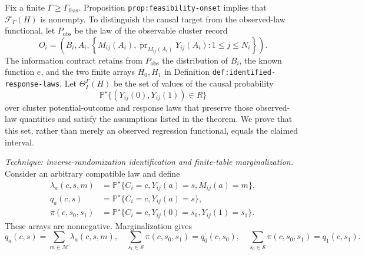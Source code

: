 Fix a finite \(\Gamma\geq\Gamma_{\mathrm{feas}}\).  Proposition \texttt{prop:feasibility-onset} implies that \(\mathcal F_{\Gamma}(H)\) is nonempty.  To distinguish the causal target from the observed-law functional, let \(P_{\mathrm{obs}}\) be the law of the observable cluster record
\[
O_i=\left(B_i,A_i,
  \left\{M_{ij}(A_i),
  \operatorname{pr}_{M_{ij}(A_i)}Y_{ij}(A_i):1\leq j\leq N_i\right\}
  \right).
\]
The information contract retains from \(P_{\mathrm{obs}}\) the distribution of \(B_i\), the known function \(e\), and the two finite arrays \(H_0,H_1\) in Definition \texttt{def:identified-response-laws}.  Let \(\Theta_I^{\Gamma}(H)\) be the set of values of the causal probability
\[
\mathbb P^{\star}\{(Y_{ij}(0),Y_{ij}(1))\in R\}
\]
over cluster potential-outcome and response laws that preserve those observed-law quantities and satisfy the assumptions listed in the theorem.  We prove that this set, rather than merely an observed regression functional, equals the claimed interval.

\emph{Technique: inverse-randomization identification and finite-table marginalization.}
Consider an arbitrary compatible law and define
\[
\begin{aligned}
\lambda_a(c,s,m)
  &=\mathbb P^{\star}\{C_i=c,Y_{ij}(a)=s,M_{ij}(a)=m\},\\
q_a(c,s)
  &=\mathbb P^{\star}\{C_i=c,Y_{ij}(a)=s\},\\
\pi(c,s_0,s_1)
  &=\mathbb P^{\star}\{C_i=c,Y_{ij}(0)=s_0,Y_{ij}(1)=s_1\}.
\end{aligned}
\]
These arrays are nonnegative.  Marginalization gives
\[
q_a(c,s)=\sum_{m\in\mathcal M}\lambda_a(c,s,m),
\quad
\sum_{s_1\in\mathcal S}\pi(c,s_0,s_1)=q_0(c,s_0),
\quad
\sum_{s_0\in\mathcal S}\pi(c,s_0,s_1)=q_1(c,s_1).
\]

